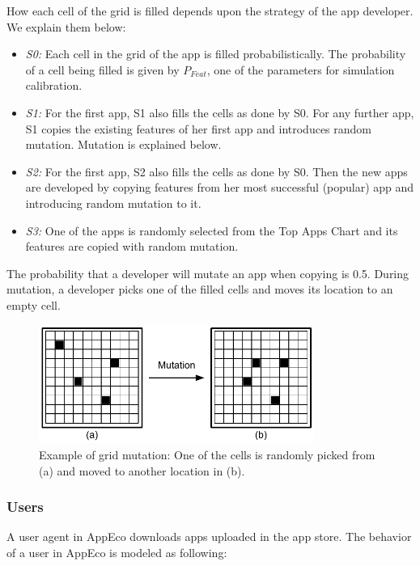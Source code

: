 How each cell of the grid is filled depends upon the strategy of the app developer. We explain them below:

\begin{itemize}
  \item \emph{S0:} Each cell in the grid of the app is filled probabilistically. The probability of a cell being filled is given by $P_{Feat}$, one of the parameters for simulation calibration.
  \item \emph{S1:} For the first app, S1 also fills the cells as done by S0. For any further app, S1 copies the existing features of her first app and introduces random mutation. Mutation is explained below.
  \item \emph{S2:} For the first app, S2 also fills the cells as done by S0. Then the new apps are developed by copying features from her most successful (popular) app and introducing random mutation to it.
  \item \emph{S3:} One of the apps is randomly selected from the Top Apps Chart and its features are copied with random mutation.
\end{itemize}

The probability that a developer will mutate an app when copying is 0.5. During mutation, a developer picks one of the filled cells and moves its location to an empty cell.

\begin{figure}[!htb]
  \centering
  \includegraphics[width=9cm]{figures/example_app_grid_mutation.pdf}
  \caption{Example of grid mutation: One of the cells is randomly picked from (a) and moved to another location in (b).}
  \label{fig:example-grid-mutation}
\end{figure}

\subsubsection*{Users}

A user agent in AppEco downloads apps uploaded in the app store. The behavior of a user in AppEco is modeled as following:

